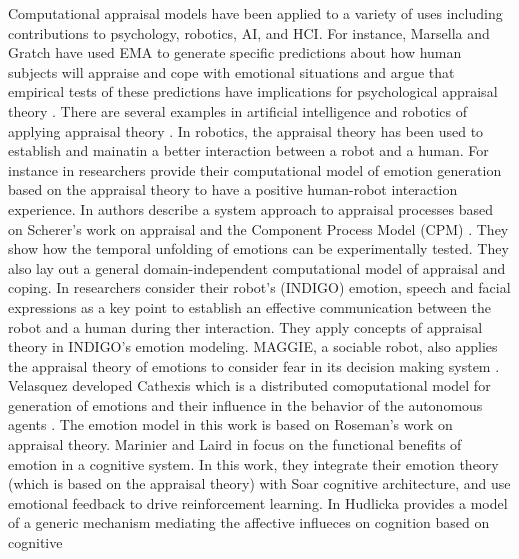 \documentclass[11pt]{article}
\begin{document}
Computational appraisal models have been applied to a variety of uses including
contributions to psychology, robotics, AI, and HCI. For instance, Marsella and
Gratch have used EMA \cite{marsella:ema-process-model} to generate specific
predictions about how human subjects will appraise and cope with emotional
situations and argue that empirical tests of these predictions have implications
for psychological appraisal theory \cite{gratch:assessing-appraisal}
\cite{marsella:assessing-coping}. There are several examples in artificial
intelligence and robotics of applying appraisal theory
\cite{adam:bdi-emotional-companion} \cite{kim:model-hri-appraisal}
\cite{marsella:ema-process-model}. In robotics, the appraisal theory has been
used to establish and mainatin a better interaction between a robot and a human.
For instance in \cite{kim:model-hri-appraisal} researchers provide their
computational model of emotion generation based on the appraisal theory to have
a positive human-robot interaction experience. In
\cite{sander:systems-approach-appraisal} authors describe a system approach to
appraisal processes based on Scherer's work on appraisal and the Component
Process Model (CPM) \cite{scherer:nature-function-emotion}. They show how the
temporal unfolding of emotions can be experimentally tested. They also lay out a
general domain-independent computational model of appraisal and coping. In
\cite{vogiatzis:robot-museum} researchers consider their robot's (INDIGO)
emotion, speech and facial expressions as a key point to establish an effective
communication between the robot and a human during ther interaction. They apply
concepts of appraisal theory in INDIGO's emotion modeling. MAGGIE, a sociable
robot, also applies the appraisal theory of emotions to consider fear in its
decision making system \cite{castro:autonomous-robot-fear}. Velasquez developed
Cathexis which is a distributed comoputational model for generation of emotions
and their influence in the behavior of the autonomous agents
\cite{velasquez:emotions-motivations-agents}. The emotion model in this work is
based on Roseman's work on appraisal theory. Marinier and Laird in
\cite{marinier:emotion-reinforcement} focus on the functional benefits of
emotion in a cognitive system. In this work, they integrate their emotion theory
(which is based on the appraisal theory) with Soar cognitive architecture, and
use emotional feedback to drive reinforcement learning. In
\cite{hudlicka:emotinos-reasons} Hudlicka provides a model of a generic
mechanism mediating the affective influeces on cognition based on cognitive
\end{document}
